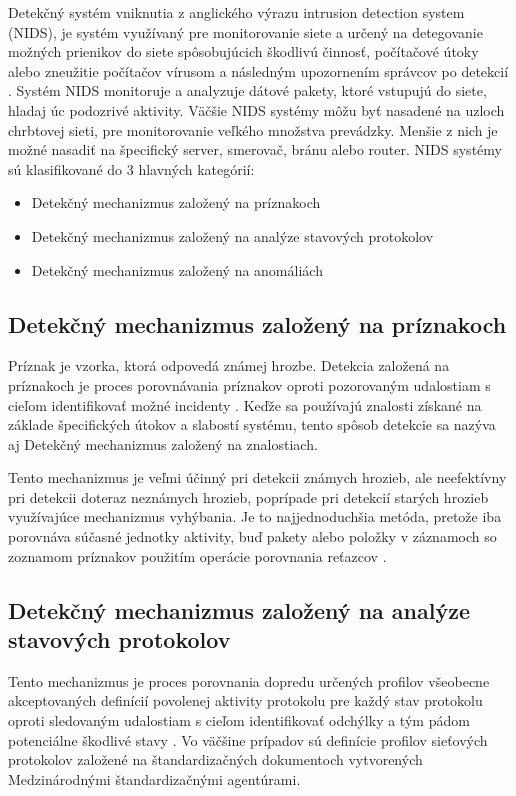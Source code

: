 Detekčný systém vniknutia z anglického výrazu intrusion detection system (NIDS), je systém využívaný pre monitorovanie siete a určený na detegovanie možných prienikov do siete spôsobujúcich škodlivú činnosť, počítačové útoky alebo zneužitie počítačov vírusom a následným upozornením správcov po detekcií \cite{NIDS-Kumar}. Systém NIDS monitoruje a analyzuje dátové pakety, ktoré vstupujú do siete, hladaj
úc podozrivé aktivity. Väčšie NIDS systémy môžu byť nasadené na uzloch chrbtovej sieti, pre monitorovanie veľkého množstva prevádzky. Menšie z nich je možné nasadiť na špecifický server, smerovač, bránu alebo router. 
\newline
\newline
NIDS systémy sú klasifikované do 3 hlavných kategórií:
\begin{itemize}
    \item Detekčný mechanizmus založený na príznakoch
    \item Detekčný mechanizmus založený na analýze stavových protokolov
    \item Detekčný mechanizmus založený na anomáliách
\end{itemize}

\subsection*{Detekčný mechanizmus založený na príznakoch}
Príznak je vzorka, ktorá odpovedá známej hrozbe. Detekcia založená na príznakoch je proces porovnávania príznakov oproti pozorovaným udalostiam s cieľom identifikovať možné incidenty \cite{NIDS-Hung-Chun}. Keďže sa používajú znalosti získané na základe špecifických útokov a slabostí systému, tento spôsob detekcie sa nazýva aj Detekčný mechanizmus založený na znalostiach. 

Tento mechanizmus je veľmi účinný pri detekcii známych hrozieb, ale neefektívny pri detekcii doteraz neznámych hrozieb, poprípade pri detekcií starých hrozieb využívajúce mechanizmus vyhýbania. Je to najjednoduchšia metóda, pretože iba porovnáva súčasné jednotky aktivity, buď pakety alebo položky v záznamoch so zoznamom príznakov použitím operácie porovnania reťazcov \cite{NIDS-PDF}.

\subsection*{Detekčný mechanizmus založený na analýze stavových protokolov}
Tento mechanizmus je proces porovnania dopredu určených profilov všeobecne akceptovaných definícií povolenej aktivity protokolu pre každý stav protokolu oproti sledovaným udalostiam s cieľom identifikovať odchýlky a tým pádom potenciálne škodlivé stavy \cite{NIDS-Hung-Chun}. Vo väčšine prípadov sú definície profilov sieťových protokolov založené na štandardizačných dokumentoch vytvorených Medzinárodnými štandardizačnými agentúrami. 

